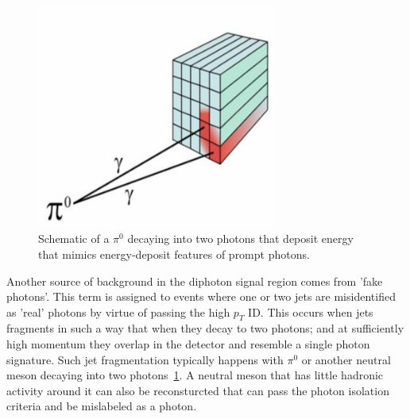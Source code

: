 \begin{figure}[htbp!]
\caption{Schematic of a $\pi^{0}$ decaying into two photons that deposit energy that mimics energy-deposit features of prompt photons.}
\begin{center}
\includegraphics[angle=0,width=0.7\textwidth]{fig/SchematicOfJetFakingPhoton.png}
\end{center}
\label{fig:pi0Decay}
\end{figure}

Another source of background in the diphoton signal region comes from 'fake photons'. This term is assigned to events where one or two jets are misidentified as 'real' photons by virtue of passing the high $p_T$ ID. This occurs when jets fragments in such a way that when they decay to two photons; and at sufficiently high momentum they overlap in the detector and resemble a single photon signature. Such jet fragmentation typically happens with $\pi^{0}$ or another neutral meson decaying into two photons~\ref{fig:pi0Decay}. A neutral meson that has little hadronic activity around it can also be reconsturcted that can pass the photon isolation criteria and be mislabeled as a photon. 



